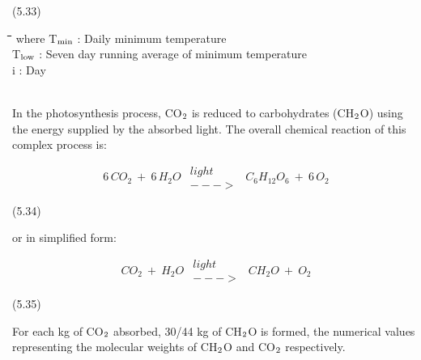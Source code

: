 \documentclass[11pt]{article}
\begin{document}
\bigskip
\strut\hfill (5.33)

\nwln
\begin{tabbing}
\hspace{1.27cm}\=\hspace{1.27cm}\=\hspace{1.27cm}\=\hspace{1.27cm}\=%
\hspace{1.27cm}\=\hspace{1.27cm}\=\hspace{1.27cm}\=\hspace{1.27cm}\=%
\hspace{1.27cm}\=\hspace{1.27cm}\=\kill
where\> T$_{{\rm min}}$ \> : Daily minimum temperature\> \> \> \> \> \> \> \> [\degrees C]\\
\>T$_{{\rm low}}$\> : Seven day running average of minimum tempera\-ture\> \> \> \> \> \> \> \> [\degrees C]\\
\>i\> : Day\> \> \> \> \> \> \> \> [-]
\end{tabbing}

\bigskip
\bigskip
{}\\
In the photosynthesis process, CO$_{{\rm 2}}$ is reduced to carbohydrates (CH$_{{\rm 2}}$O) using the energy
supplied by the absorbed light. The overall chemical reaction of this complex process is:

\begin{displaymath}
6\, CO _{2} ~+~ 6\, H _{2} O ~\,\begin{array}{c}{light}  \\
{--->}\end{array} \, ~C _{6} H _{12} O _{6} ~+~ 6\, O _{2}
\end{displaymath}

 \bigskip
\strut\hfill (5.34)

\bigskip
\bigskip
or in simplified form:

\begin{displaymath}
CO _{2} ~+~ H _{2} O~\,\begin{array}{c}{light}  \\
{--->}\end{array} \, ~ CH _{2} O ~+~ O _{2}
\end{displaymath}

 \bigskip
\strut\hfill (5.35)

\bigskip
\bigskip
For each kg of CO$_{{\rm 2}}$ absorbed, 30/44 kg of CH$_{{\rm 2}}$O is formed, the numerical values
representing the molecular weights of CH$_{{\rm 2}}$O and CO$_{{\rm 2}}$ respectively.
\end{document}
